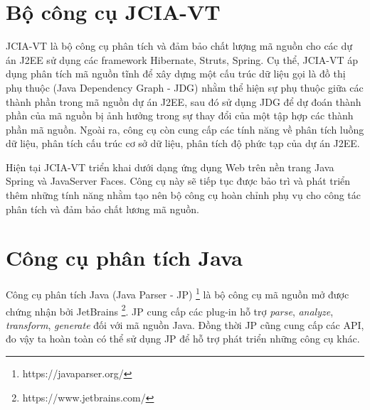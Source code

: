 \documentclass[12pt]{report}
\begin{document}
\section{Bộ công cụ JCIA-VT}
JCIA-VT \cite{jcia-vt} là bộ công cụ phân tích và đảm bảo chất lượng mã nguồn cho các dự án J2EE sử dụng các framework Hibernate, Struts, Spring. Cụ thể, JCIA-VT áp dụng phân tích mã nguồn tĩnh để xây dựng một cấu trúc dữ liệu gọi là đồ thị phụ thuộc (Java Dependency Graph - JDG) nhằm thể hiện sự phụ thuộc giữa các thành phần trong mã nguồn dự án J2EE, sau đó sử dụng JDG để dự đoán thành phần của mã nguồn bị ảnh hưởng trong sự thay đổi của một tập hợp các thành phần mã nguồn. Ngoài ra, công cụ còn cung cấp các tính năng về phân tích luồng dữ liệu, phân tích cấu trúc cơ sở dữ liệu, phân tích độ phức tạp của dự án J2EE.

\noindent Hiện tại JCIA-VT triển khai dưới dạng ứng dụng Web trên nền trang Java Spring và JavaServer Faces. Công cụ này sẽ tiếp tục được bảo trì và phát triển thêm những tính năng nhằm tạo nên bộ công cụ hoàn chỉnh phụ vụ cho công tác phân tích và đảm bảo chất lương mã nguồn.
\section{Công cụ phân tích Java}
Công cụ phân tích Java (Java Parser - JP) \footnote{https://javaparser.org/} là bộ công cụ mã nguồn mở được chứng nhận bởi JetBrains \footnote{https://www.jetbrains.com/}. JP cung cấp các plug-in hỗ trợ \textit{parse}, \textit{analyze}, \textit{transform}, \textit{generate }đối với mã nguồn Java. Đồng thời JP cũng cung cấp các API, đo vậy ta hoàn toàn có thể sử dụng JP để hỗ trợ phát triển những công cụ khác. 
\end{document}
